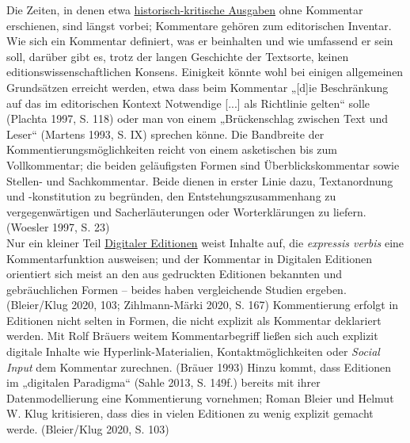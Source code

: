 \documentclass{article}
\begin{document}
    Die Zeiten, in denen etwa \href{http://gams.uni-graz.at/o:konde.93}{historisch-kritische Ausgaben} ohne Kommentar erschienen, sind längst
                  vorbei; Kommentare gehören zum editorischen Inventar. Wie sich ein Kommentar
                  definiert, was er beinhalten und wie umfassend er sein soll, darüber gibt es,
                  trotz der langen Geschichte der Textsorte, keinen editionswissenschaftlichen
                  Konsens. Einigkeit könnte wohl bei einigen allgemeinen Grundsätzen erreicht
                  werden, etwa dass beim Kommentar „[d]ie Beschränkung auf das im editorischen
                  Kontext Notwendige [...] als Richtlinie gelten“ solle (Plachta 1997, S.
                     118) oder man von einem „Brückenschlag zwischen Text und Leser“
                     (Martens 1993, S. IX) sprechen könne. Die Bandbreite der
                  Kommentierungsmöglichkeiten reicht von einem asketischen bis zum Vollkommentar;
                  die beiden geläufigsten Formen sind Überblickskommentar sowie Stellen- und
                  Sachkommentar. Beide dienen in erster Linie dazu, Textanordnung und -konstitution
                  zu begründen, den Entstehungszusammenhang zu vergegenwärtigen und
                  Sacherläuterungen oder Worterklärungen zu liefern. (Woesler 1997, S.
                     23)\\
            
        Nur ein kleiner Teil \href{http://gams.uni-graz.at/o:konde.59}{Digitaler
                     Editionen} weist Inhalte auf, die \emph{expressis verbis}
                  eine Kommentarfunktion ausweisen; und der Kommentar in Digitalen Editionen
                  orientiert sich meist an den aus gedruckten Editionen bekannten und gebräuchlichen
                  Formen – beides haben vergleichende Studien ergeben. (Bleier/Klug 2020, 103;
                     Zihlmann-Märki 2020, S. 167) Kommentierung erfolgt in Editionen nicht
                  selten in Formen, die nicht explizit als Kommentar deklariert werden. Mit Rolf
                  Bräuers weitem Kommentarbegriff ließen sich auch explizit digitale Inhalte wie
                  Hyperlink-Materialien, Kontaktmöglichkeiten oder \emph{Social Input
                  } dem Kommentar zurechnen. (Bräuer 1993) Hinzu kommt, dass
                  Editionen im „digitalen Paradigma“ (Sahle 2013, S. 149f.) bereits mit
                  ihrer Datenmodellierung eine Kommentierung vornehmen; Roman Bleier und Helmut W.
                  Klug kritisieren, dass dies in vielen Editionen zu wenig explizit gemacht werde.
                     (Bleier/Klug 2020, S. 103)\\
            
\end{document}
